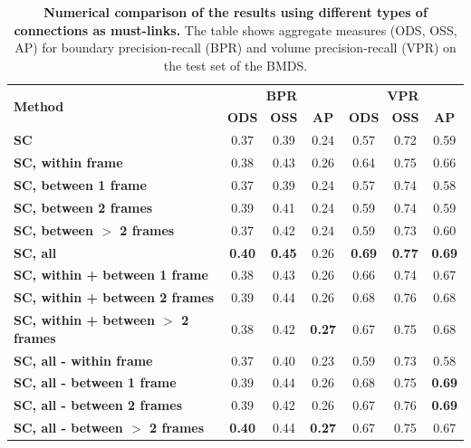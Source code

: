 \begin{table}[htbp]
\renewcommand{\arraystretch}{1.15}
\centering
\scriptsize
\begin{tabular}{|l||c|c|c||c|c|c||}
\hline 
\multirow{2}{*}{\textbf{Method}} & \multicolumn{3}{c||}{\textbf{BPR}} & \multicolumn{3}{c||}{\textbf{VPR}}\\
\cline{2-7}
& \textbf{ODS}  & \textbf{OSS} & \textbf{AP}
& \textbf{ODS} & \textbf{OSS} & \textbf{AP}\\
\hline
\hline
\textbf{SC} & 0.37 & 0.39 & 0.24 & 0.57 &0.72 & 0.59 \\
\hline \hline
\textbf{SC, within frame} & 0.38 & 0.43 & 0.26 & 0.64 & 0.75 & 0.66\\
\hline
\textbf{SC, between 1 frame} & 0.37 & 0.39 & 0.24 & 0.57 & 0.74 & 0.58\\
\hline
\textbf{SC, between 2 frames} & 0.39 & 0.41 & 0.24 & 0.59 & 0.74 & 0.59\\
\hline
\textbf{SC, between $>$ 2 frames} & 0.37 & 0.42 & 0.24 & 0.59 & 0.73 & 0.60 \\
\hline
\textbf{SC, all} & \textbf{0.40} & \textbf{0.45} & 0.26 & \textbf{0.69} & \textbf{0.77} & \textbf{0.69} \\
\hline
\hline
\textbf{SC, within + between 1 frame} & 0.38 & 0.43 & 0.26 & 0.66 & 0.74 & 0.67 \\
\hline
\textbf{SC, within + between 2 frames} & 0.39 & 0.44 & 0.26 & 0.68 & 0.76 & 0.68 \\
\hline
\textbf{SC, within + between $>$ 2 frames} & 0.38 & 0.42 & \textbf{0.27} & 0.67 & 0.75 & 0.68 \\
\hline
\hline
\textbf{SC, all - within frame} & 0.37 & 0.40 & 0.23 & 0.59 & 0.73 & 0.58 \\
\hline
\textbf{SC, all - between 1 frame} & 0.39 & 0.44 & 0.26 & 0.68 & 0.75 & \textbf{0.69} \\
\hline
\textbf{SC, all - between 2 frames} & 0.39 & 0.42 & 0.26 & 0.67 & 0.76 & \textbf{0.69} \\
\hline
\textbf{SC, all - between $>$ 2 frames} & \textbf{0.40} & 0.44 & \textbf{0.27} & 0.67 & 0.75 & 0.67 \\
\hline
\end{tabular}
 \caption{{\bf Numerical comparison of the results using different types of connections as must-links.} 
The table shows aggregate measures (ODS, OSS, AP) for boundary precision-recall (BPR) and volume precision-recall (VPR) on the test set of the BMDS.}
\label{tab:ml_comparison}
\end{table}

